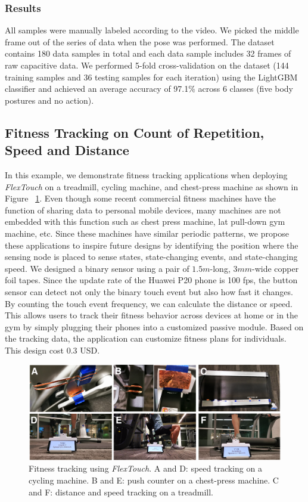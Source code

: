 \subsubsection{Results}
All samples were manually labeled according to the video. We picked the middle frame out of the series of data when the pose was performed. The dataset contains 180 data samples in total and each data sample includes 32 frames of raw capacitive data. We performed 5-fold cross-validation on the dataset (144 training samples and 36 testing samples for each iteration) using the LightGBM classifier and achieved an average accuracy of 97.1\% across 6 classes (five body postures and no action).

\subsection{Fitness Tracking on Count of Repetition, Speed and Distance}
In this example, we demonstrate fitness tracking applications when deploying \textit{FlexTouch} on a treadmill, cycling machine, and chest-press machine as shown in Figure ~\ref{fig:fitness}. Even though some recent commercial fitness machines have the function of sharing data to personal mobile devices, many machines are not embedded with this function such as chest press machine, lat pull-down gym machine, etc. Since these machines have similar periodic patterns, we propose these applications to inspire future designs by identifying the position where the sensing node is placed to sense states, state-changing events, and state-changing speed. We designed a binary sensor using a pair of $1.5m$-long, $3 mm$-wide copper foil tapes. Since the update rate of the Huawei P20 phone is 100 fps, the button sensor can detect not only the binary touch event but also how fast it changes. By counting the touch event frequency, we can calculate the distance or speed. This allows users to track their fitness behavior across devices at home or in the gym by simply plugging their phones into a customized passive module. Based on the tracking data, the application can customize fitness plans for individuals. This design cost 0.3 USD.

\begin{figure}[ht]
\centering
  \includegraphics[width=0.95\columnwidth]{figures/gym.png}
  \setlength{\belowcaptionskip}{-4pt}
  \caption{Fitness tracking using \textit{FlexTouch}. A and D: speed tracking on a cycling machine. B and E: push counter on a chest-press machine. C and F: distance and speed tracking on a treadmill.}  
  \label{fig:fitness}
\end{figure}


